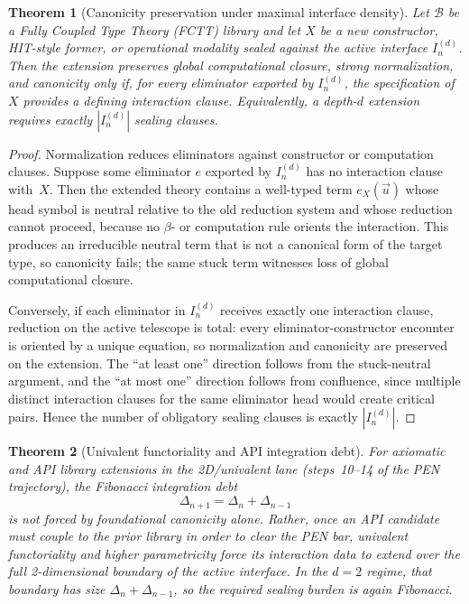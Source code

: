 \documentclass[11pt,a4paper]{article}
\theoremstyle{plain}
\newtheorem{theorem}{Theorem}[section]
\theoremstyle{definition}
\theoremstyle{remark}
\begin{document}
\begin{theorem}[Canonicity preservation under maximal interface density]
\label{thm:canonicity-preservation}
Let $\mathcal{B}$ be a Fully Coupled Type Theory (FCTT) library and let $X$ be a new constructor, HIT-style former, or operational modality sealed against the active interface $I_n^{(d)}$.
Then the extension preserves global computational closure, strong normalization, and canonicity only if, for every eliminator exported by $I_n^{(d)}$, the specification of $X$ provides a defining interaction clause.
Equivalently, a depth-$d$ extension requires exactly $|I_n^{(d)}|$ sealing clauses.
\end{theorem}

\begin{proof}
Normalization reduces eliminators against constructor or computation clauses.
Suppose some eliminator $e$ exported by $I_n^{(d)}$ has no interaction clause with~$X$.
Then the extended theory contains a well-typed term $e_X(\vec{u})$ whose head symbol is neutral relative to the old reduction system and whose reduction cannot proceed, because no $\beta$- or computation rule orients the interaction.
This produces an irreducible neutral term that is not a canonical form of the target type, so canonicity fails; the same stuck term witnesses loss of global computational closure.

Conversely, if each eliminator in $I_n^{(d)}$ receives exactly one interaction clause, reduction on the active telescope is total: every eliminator-constructor encounter is oriented by a unique equation, so normalization and canonicity are preserved on the extension.
The ``at least one'' direction follows from the stuck-neutral argument, and the ``at most one'' direction follows from confluence, since multiple distinct interaction clauses for the same eliminator head would create critical pairs.
Hence the number of obligatory sealing clauses is exactly $|I_n^{(d)}|$.
\end{proof}

\begin{theorem}[Univalent functoriality and API integration debt]
\label{thm:univalent-functoriality}
For axiomatic and API library extensions in the 2D/univalent lane (steps~10--14 of the PEN trajectory), the Fibonacci integration debt
\[
  \Delta_{n+1} = \Delta_n + \Delta_{n-1}
\]
is not forced by foundational canonicity alone.
Rather, once an API candidate must couple to the prior library in order to clear the PEN bar, univalent functoriality and higher parametricity force its interaction data to extend over the full 2-dimensional boundary of the active interface.
In the $d=2$ regime, that boundary has size $\Delta_n + \Delta_{n-1}$, so the required sealing burden is again Fibonacci.
\end{theorem}
\end{document}
